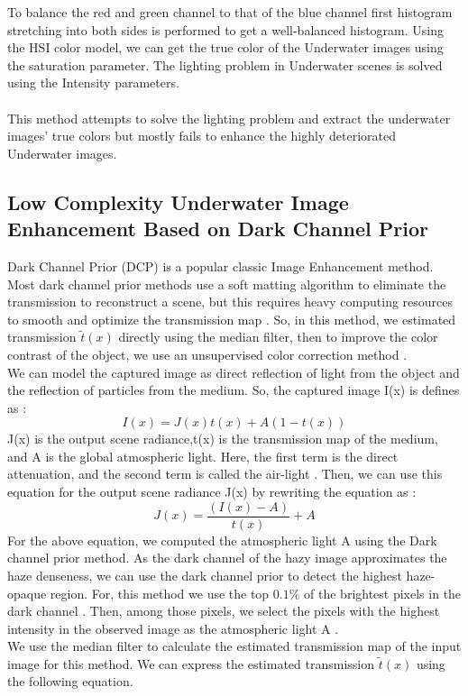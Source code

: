 \documentclass[a4paper,11pt,oneside]{article}
\begin{document}
To balance the red and green channel to that of the blue channel first histogram stretching into both sides is performed to get a well-balanced histogram. Using the HSI color model, we can get the true color of the Underwater images using the saturation parameter. The lighting problem in Underwater scenes is solved using the Intensity parameters. \cite{4} \\
\\
This method attempts to solve the lighting problem and extract the underwater images' true colors but mostly fails to enhance the highly deteriorated Underwater images.

\subsection{Low Complexity Underwater Image Enhancement Based on Dark Channel Prior \cite{8}}
Dark Channel Prior (DCP) is a popular classic Image Enhancement method. Most dark channel prior methods use a soft matting algorithm to eliminate the transmission to reconstruct a scene, but this requires heavy computing resources to smooth and optimize the transmission map \cite{8}. So, in this method, we estimated transmission $\tilde{t}(x)$ directly using the median filter, then to improve the color contrast of the object, we use an unsupervised color correction method \cite{8}.\\
We can model the captured image as direct reflection of light from the object and the reflection of particles from the medium. So, the captured image I(x) is defines as \cite{8}:
$$I(x) = J(x)t(x) + A(1-t(x))$$
J(x) is the output scene radiance,t(x) is the transmission map of the medium, and A is the global atmospheric light. Here, the first term is the direct attenuation, and the second term is called the air-light \cite{8}. Then, we can use this equation for the output scene radiance J(x) by rewriting the equation as \cite{8}:
$$J(x) = \frac{(I(x) - A)}{t(x)} + A$$
For the above equation,  we computed the atmospheric light A using the Dark channel prior method. As the dark channel of the hazy image approximates the haze denseness, we can use the dark channel prior to detect the highest haze-opaque region. For, this method we use the top $0.1\%$ of the brightest pixels in the dark channel \cite{8}. Then, among those pixels, we select the pixels with the highest intensity in the observed image as the atmospheric light A \cite{8}.\\
We use the median filter to calculate the estimated transmission map of the input image for this method. We can express the estimated transmission $\tilde{t}(x)$ using the following equation.
\end{document}
